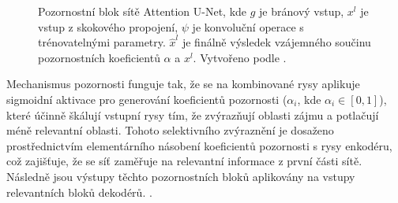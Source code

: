 \begin{figure}[H]
\caption[Pozornostní blok sítě Attention U-Net]{Pozornostní blok sítě Attention U-Net, kde $g$ je bránový vstup, $x^l$ je vstup z skokového propojení, $\psi$ je konvoluční operace s trénovatelnými parametry. $\hat{x}^l$ je finálně výsledek vzájemného součinu pozornostních koeficientů $\alpha$ a $x^l$. Vytvořeno podle \cite{attentionunet}. }
\label{fig:attention_unet}
\end{figure}

Mechanismus pozornosti funguje tak, že se na kombinované rysy aplikuje sigmoidní aktivace pro generování koeficientů pozornosti (\(\alpha_i\), kde \(\alpha_i \in [0, 1]\)), které účinně škálují vstupní rysy tím, že zvýrazňují oblasti zájmu a potlačují méně relevantní oblasti. Tohoto selektivního zvýraznění je dosaženo prostřednictvím elementárního násobení koeficientů pozornosti s rysy enkodéru, což zajišťuje, že se síť zaměřuje na relevantní informace z první části sítě. Následně jsou výstupy těchto pozornostních bloků aplikovány na vstupy relevantních bloků dekodérů. \cite{attentionunet}.

\endinput